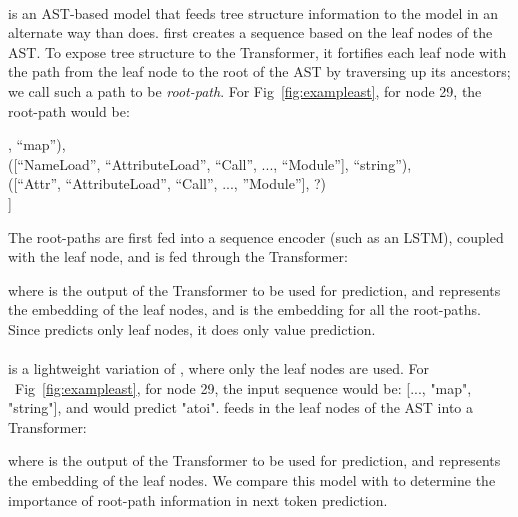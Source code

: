 \documentclass[nonacm, sigconf]{acmart}
\newcommand{\figref}[1]{Fig~\ref{#1}}
\begin{document}
\paragraph{\textbf{\RootPath}}
\RootPath is an AST-based model that feeds tree structure information to the model in an alternate way than \DFS does. \RootPath first creates a sequence based on the leaf nodes of the AST. To expose tree structure to the Transformer, it fortifies each leaf node with the path from the leaf node to the root of the AST by traversing up its ancestors; we call such a path to be \textit{root-path}.  For Fig~\ref{fig:exampleast}, for node 29, the root-path would be:

\noindent
[..., \\
([``NameLoad'', ``Call'', ... ``Module''], “map”), \\
([``NameLoad'', ``AttributeLoad'', ``Call'', ..., ``Module''], “string”), \\
([``Attr'', ``AttributeLoad'', ``Call'', ..., ''Module''], ?)\\
]

The root-paths are first fed into a sequence encoder (such as an LSTM), coupled with the leaf node, and is fed through the Transformer:

where  is the output of the Transformer to be used for prediction, and  represents the embedding of the leaf nodes, and  is the embedding for all the root-paths.  
Since \RootPath predicts only leaf nodes, it does only value prediction.




\paragraph{\textbf{\LeafTokens}}
\LeafTokens is a lightweight variation of \RootPath, where only the leaf nodes are used. For ~\figref{fig:exampleast}, for node 29, the input sequence would be: [..., "map", "string"], and would predict "atoi". \LeafTokens feeds in the leaf nodes of the AST into a Transformer:  

where  is the output of the Transformer to be used for prediction, and  represents the embedding of the leaf nodes. We compare this model with \RootPath to determine the importance of root-path information in next token prediction.
\end{document}
